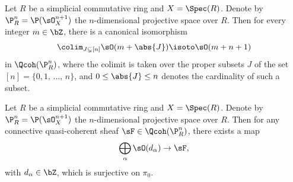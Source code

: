 \begin{lemm}\label{lem:O(n+1)}
Let $R$ be a simplicial commutative ring and $X = \Spec(R)$. Denote by $\P^n_R = \P(\sO^{n+1}_X)$ the $n$-dimensional projective space over $R$. Then for every integer $m\in\bZ$, there is a canonical isomorphism
\[
\colim_{J \subsetneq [n]} \sO(m+\abs{J}) \isoto \sO(m+n+1)
\]
in $\Qcoh(\P^n_R)$, where the colimit is taken over the proper subsets $J$ of the set\linebreak$[n] = \{0,1,\,\ldots,\,n\}$, and $0\le\abs{J}\le n$ denotes the cardinality of such a subset.
\end{lemm}

\begin{lemm}\label{lem:surjection from O(m)'s}
Let $R$ be a simplicial commutative ring and $X = \Spec(R)$. Denote by $\P^n_R = \P(\sO^{n+1}_X)$ the $n$-dimensional projective space over $R$. Then for any connective quasi-coherent sheaf $\sF \in \Qcoh(\P^n_R)$, there exists a map
\[
\bigoplus_\alpha \sO(d_\alpha) \to \sF,
\]
with $d_\alpha \in \bZ$, which is surjective on $\pi_0$.
\end{lemm}

